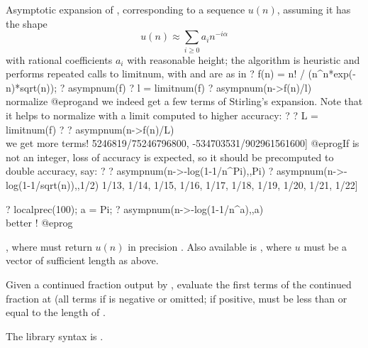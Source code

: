 \label{se:asympnum}
Asymptotic expansion of , corresponding to a sequence $u(n)$,
assuming it has the shape
$$u(n) \approx \sum_{i \geq 0} a_i n^{-i\alpha}$$
with rational coefficients $a_i$ with reasonable height; the algorithm
is heuristic and performs repeated calls to limitnum, with
 and  are as in 
\bprog
? f(n) = n! / (n^n*exp(-n)*sqrt(n));
? asympnum(f)
? l = limitnum(f)
? asympnum(n->f(n)/l) \\ normalize
@eprog\noindent and we indeed get a few terms of Stirling's expansion. Note
that it helps to normalize with a limit computed to higher accuracy:
\bprog
? 
? L = limitnum(f)
? 
? asympnum(n->f(n)/L) \\ we get more terms!
      5246819/75246796800, -534703531/902961561600]
@eprog\noindent If  is not an integer, loss of accuracy is
expected, so it should be precomputed to double accuracy, say:
\bprog
? 
? asympnum(n->-log(1-1/n^Pi),,Pi)
? asympnum(n->-log(1-1/sqrt(n)),,1/2)
  1/13, 1/14, 1/15, 1/16, 1/17, 1/18, 1/19, 1/20, 1/21, 1/22]

? localprec(100); a = Pi;
? asympnum(n->-log(1-1/n^a),,a) \\ better !
@eprog

, where  must return $u(n)$ in precision .
Also available is
, where $u$
must be a vector of sufficient length as above.

\label{se:contfraceval}
Given a continued fraction  output by , evaluate
the first  terms of the continued fraction at  (all
terms if  is negative or omitted; if positive,  must be
less than or equal to the length of .

The library syntax is .

